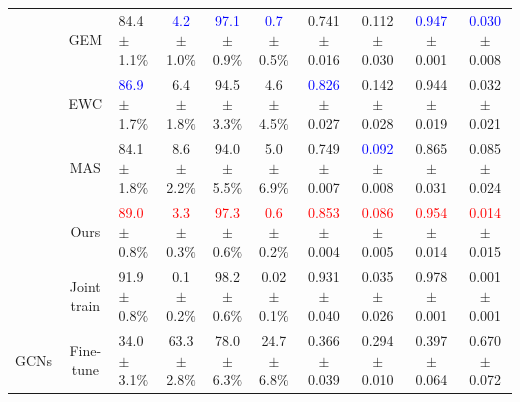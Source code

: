 \documentclass[letterpaper]{article} %
\begin{document}
\begin{table}[]
{\begin{tabular}{c|c|lc|cc|cc|cc}
                                                                       & GEM                      & 84.4 $\pm$ 1.1$\%$ & \textcolor{blue}{4.2} $\pm$ 1.0$\%$                           & \textcolor{blue}{97.1} $\pm$ 0.9$\%$                           & \textcolor{blue}{0.7} $\pm$ 0.5$\%$                           & 0.741 $\pm$ 0.016                           & 0.112 $\pm$ 0.030                           & \textcolor{blue}{0.947} $\pm$ 0.001    &  \textcolor{blue}{0.030} $\pm$ 0.008                          \\
                                                                       & EWC                      & \textcolor{blue}{86.9} $\pm$ 1.7$\%$ & 6.4 $\pm$ 1.8$\%$                           & 94.5 $\pm$ 3.3$\%$                           & 4.6 $\pm$ 4.5$\%$                           & \textcolor{blue}{0.826} $\pm$ 0.027                           & 0.142 $\pm$ 0.028                           & 0.944 $\pm$ 0.019    &0.032 $\pm$ 0.021                           \\
                                                                       & MAS                      & 84.1 $\pm$ 1.8$\%$ & 8.6 $\pm$ 2.2$\%$                           & 94.0 $\pm$ 5.5$\%$                           & 5.0 $\pm$ 6.9$\%$                           & 0.749 $\pm$ 0.007                           & \textcolor{blue}{0.092} $\pm$ 0.008                           & 0.865 $\pm$ 0.031    & 0.085 $\pm$ 0.024                           \\
                                                                       & Ours                     & \textcolor{red}{89.0} $\pm$ 0.8$\%$ & \textcolor{red}{3.3} $\pm$ 0.3$\%$ & \textcolor{red}{97.3} $\pm$ 0.6$\%$ & \textcolor{red}{0.6} $\pm$ 0.2$\%$ & \textcolor{red}{0.853} $\pm$ 0.004 & \textcolor{red}{0.086} $\pm$ 0.005 & \textcolor{red}{0.954} $\pm$ 0.014    & \textcolor{red}{0.014} $\pm$ 0.015 \\ %
                                                                       & Joint train              & 91.9 $\pm$ 0.8$\%$ & 0.1 $\pm$ 0.2$\%$                           & 98.2 $\pm$ 0.6$\%$                           & 0.02 $\pm$ 0.1$\%$                          & 0.931 $\pm$ 0.040                           & 0.035 $\pm$ 0.026                           & 0.978 $\pm$ 0.001    & 0.001 $\pm$ 0.001                           \\ \bottomrule
                                                                        \toprule
\multirow{7}{*}{GCNs}                                                   & Fine-tune                 & 34.0 $\pm$ 3.1$\%$ & 63.3 $\pm$ 2.8$\%$                          & 78.0 $\pm$ 6.3$\%$                           & 24.7 $\pm$ 6.8$\%$                         & 0.366 $\pm$ 0.039                           & 0.294 $\pm$ 0.010                           & 0.397 $\pm$ 0.064    & 0.670 $\pm$ 0.072                           \\ %

\end{tabular}}
\end{table}
\end{document}
